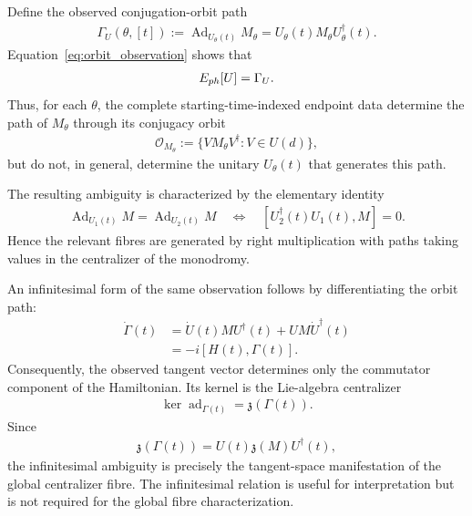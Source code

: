 \documentclass[10pt,a4paper]{amsart}
\begin{document}
Define the observed conjugation-orbit path
\begin{align}
\Gamma_U(\theta,[t])
:=
\operatorname{Ad}_{U_\theta(t)}M_\theta
=
U_\theta(t)M_\theta U_\theta^\dagger(t).
\end{align}
Equation~\eqref{eq:orbit_observation} shows that
\begin{align}
E_{\rm ph}[U]=\Gamma_U.
\end{align}
Thus, for each $\theta$, the complete starting-time-indexed endpoint data determine the path of $M_\theta$ through its conjugacy orbit
\begin{align}
\mathcal O_{M_\theta}
:=
\{VM_\theta V^\dagger:V\in U(d)\},
\end{align}
but do not, in general, determine the unitary $U_\theta(t)$ that generates this path.

The resulting ambiguity is characterized by the elementary identity
\begin{align}
\operatorname{Ad}_{U_1(t)}M
=
\operatorname{Ad}_{U_2(t)}M
\quad\Longleftrightarrow\quad
[U_2^\dagger(t)U_1(t),M]=0.
\label{eq:orbit_fibre_identity}
\end{align}
Hence the relevant fibres are generated by right multiplication with paths taking values in the centralizer of the monodromy.

An infinitesimal form of the same observation follows by differentiating the orbit path:
\begin{align}
\dot\Gamma(t)
&=
\dot U(t)MU^\dagger(t)
+
UM\dot U^\dagger(t)
\nonumber\\
&=
-i[H(t),\Gamma(t)].
\label{eq:Gamma_dot}
\end{align}
Consequently, the observed tangent vector determines only the commutator component of the Hamiltonian. Its kernel is the Lie-algebra centralizer
\begin{align}
\ker\operatorname{ad}_{\Gamma(t)}
=
\mathfrak z(\Gamma(t)).
\end{align}
Since
\begin{align}
\mathfrak z(\Gamma(t))
=
U(t)\mathfrak z(M)U^\dagger(t),
\end{align}
the infinitesimal ambiguity is precisely the tangent-space manifestation of the global centralizer fibre. The infinitesimal relation is useful for interpretation but is not required for the global fibre characterization.
\end{document}
